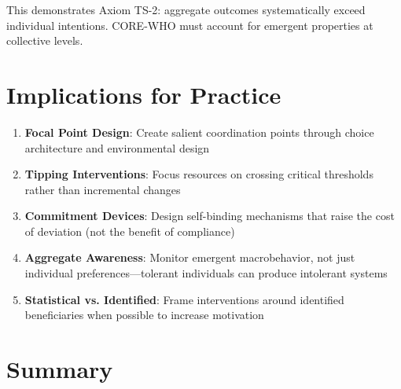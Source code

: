 This demonstrates Axiom TS-2: aggregate outcomes systematically exceed individual
intentions. CORE-WHO must account for emergent properties at collective levels.


\section{Implications for Practice}
\label{sec:ts-practice}

\begin{tcolorbox}[colback=green!5!white, colframe=green!75!black,
    title=Practical Implications]
\begin{enumerate}
\item \textbf{Focal Point Design}: Create salient coordination points through
      choice architecture and environmental design
\item \textbf{Tipping Interventions}: Focus resources on crossing critical
      thresholds rather than incremental changes
\item \textbf{Commitment Devices}: Design self-binding mechanisms that raise
      the cost of deviation (not the benefit of compliance)
\item \textbf{Aggregate Awareness}: Monitor emergent macrobehavior, not just
      individual preferences---tolerant individuals can produce intolerant systems
\item \textbf{Statistical vs. Identified}: Frame interventions around identified
      beneficiaries when possible to increase motivation
\end{enumerate}
\end{tcolorbox}


\section{Summary}
\label{sec:ts-summary}


